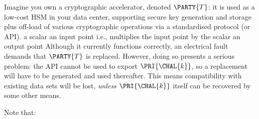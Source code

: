%



Imagine you own a cryptographic accelerator, denoted $\PARTY{T}$: it is used
as a low-cost HSM in your data center, supporting secure key generation and 
storage plus off-load of various cryptographic operations via a standardised 
protocol (or API).
\DESCINTRO[none]
{}
{a scalar}
{an  input point}
{i.e., multiplies the input point by the scalar}
{an output point}
Although it currently functions correctly, an electrical fault demands that
$\PARTY{T}$ 
is replaced.  However, doing so presents a serious problem: the API cannot 
be used to export 
$\PRI{\CHAL{k}}$, 
so a replacement will have to be generated and used thereafter.  This means 
compatibility with existing data sets will be lost, {\em unless} 
$\PRI{\CHAL{k}}$ 
itself can be recovered by some other means.




%
Note that:

